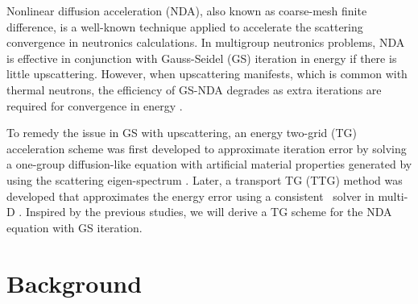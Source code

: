 Nonlinear diffusion acceleration (NDA), also known as coarse-mesh finite difference, is a well-known technique applied to accelerate the scattering convergence in neutronics calculations. In multigroup neutronics problems, NDA is effective in conjunction with Gauss-Seidel (GS) iteration in energy if there is little upscattering. However, when upscattering manifests, which is common with thermal neutrons, the efficiency of GS-NDA degrades as extra iterations are required for convergence in energy \cite{park-nda}.

To remedy the issue in GS with upscattering, an energy two-grid (TG) acceleration scheme was first developed to approximate iteration error by solving a one-group diffusion-like equation with artificial material properties generated by using the scattering eigen-spectrum \cite{morel-upscat}. Later, a transport TG (TTG) method was developed that approximates the energy error using a consistent \sn\ solver in multi-D \cite{evans-upscat}. Inspired by the previous studies, we will derive a TG scheme for the NDA equation with GS iteration.

\section{Background}
